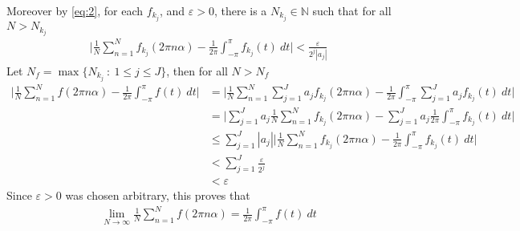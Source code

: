 \documentclass[12pt]{exam}
\theoremstyle{plain} %
\theoremstyle{definition} %
\theoremstyle{remark} %
\begin{document}
\begin{questions}
\begin{solution}
    Moreover by \autoref{eq:2}, for each $f_{k_j}$, and $\varepsilon
    > 0$, there is a $N_{k_j} \in \mathbb{N}$ such that for all $N > N_{k_j}$
    \begin{align*}
      \Bigg| \frac{1}{N} \sum_{n = 1}^{N} f_{k_j}(2\pi n \alpha) -
      \frac{1}{2\pi} \int_{-\pi}^{\pi}  f_{k_j}(t) \ dt\Bigg| <
      \frac{\varepsilon}{2^{j}|a_j|}
    \end{align*}
    Let $N_f = \max \{ N_{k_j}  \ : \  1 \le j \le J \}$, then for all $N > N_f$
    \begin{align*}
      \Bigg|\frac{1}{N} \sum_{n = 1}^{N} f(2\pi n \alpha) -
      \frac{1}{2\pi} \int_{-\pi}^{\pi}  f(t) \ dt\Bigg| &=
      \Bigg|\frac{1}{N}\sum_{n = 1}^{N} \sum_{j = 1}^{J} a_j
      f_{k_j}(2 \pi n \alpha) - \frac{1}{2\pi}
      \int_{-\pi}^{ \pi}  \sum_{j = 1}^{J} a_j f_{k_j}(t) \ dt \Bigg| \\
      &= \Bigg|\sum_{j = 1}^{J} a_j \frac{1}{N}\sum_{n = 1}^{N}
      f_{k_j}(2 \pi n \alpha) - \sum_{j = 1}^{J} a_j  \frac{1}{2\pi}
      \int_{-\pi}^{ \pi}  f_{k_j}(t) \ dt \Bigg| \\
      &\le \sum_{j = 1}^{J} |a_j| \Bigg|\frac{1}{N}\sum_{n = 1}^{N}
      f_{k_j}(2 \pi n \alpha) -  \frac{1}{2\pi}
      \int_{-\pi}^{ \pi}   f_{k_j}(t) \ dt\Bigg| \\
      &< \sum_{j = 1}^{J} \frac{\varepsilon}{2^{j}} \\
      &< \varepsilon
    \end{align*}
    Since $\varepsilon > 0$ was chosen arbitrary, this proves that
    \begin{align*}
      \lim_{N \to \infty} \frac{1}{N} \sum_{n = 1}^{N} f(2 \pi n
      \alpha) = \frac{1}{2\pi}
      \int_{- \pi}^{ \pi}  f(t) \ dt
    \end{align*}
  \end{solution}


\end{questions}
\end{document}
